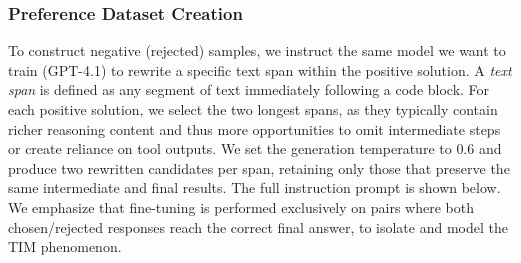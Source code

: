 \documentclass[11pt]{article}
\def \task{\textsc{TIM}\xspace}
\begin{document}
\subsubsection{Preference Dataset Creation}
To construct negative (rejected) samples, we instruct the same model we want to train (GPT-4.1) to rewrite a specific text span within the positive solution. A \textit{text span} is defined as any segment of text immediately following a code block. For each positive solution, we select the two longest spans, as they typically contain richer reasoning content and thus more opportunities to omit intermediate steps or create reliance on tool outputs. We set the generation temperature to $0.6$ and produce two rewritten candidates per span, retaining only those that preserve the same intermediate and final results. The full instruction prompt is shown below. We emphasize that fine-tuning is performed exclusively on pairs where both chosen/rejected responses reach the correct final answer, to isolate and model the \task{} phenomenon. 
\end{document}
